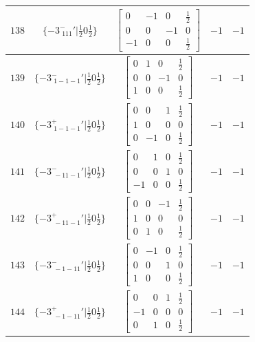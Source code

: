 \documentclass[fleqn,8pt]{jsarticle}
\begin{document}
\begin{longtable}{ccccc}
$ 138 $ & $ \{-3^{-}_{\,\,111}{}'|\frac{1}{2} 0 \frac{1}{2}\} $ & $ \begin{bmatrix} 0 & -1 & 0 & \frac{1}{2} \\ 0 & 0 & -1 & 0 \\ -1 & 0 & 0 & \frac{1}{2} \end{bmatrix} $ & $ -1 $ & $ -1 $ \\ \hline
$ 139 $ & $ \{-3^{-}_{\,\,1-1-1}{}'|\frac{1}{2} 0 \frac{1}{2}\} $ & $ \begin{bmatrix} 0 & 1 & 0 & \frac{1}{2} \\ 0 & 0 & -1 & 0 \\ 1 & 0 & 0 & \frac{1}{2} \end{bmatrix} $ & $ -1 $ & $ -1 $ \\ \hline
$ 140 $ & $ \{-3^{+}_{\,\,1-1-1}{}'|\frac{1}{2} 0 \frac{1}{2}\} $ & $ \begin{bmatrix} 0 & 0 & 1 & \frac{1}{2} \\ 1 & 0 & 0 & 0 \\ 0 & -1 & 0 & \frac{1}{2} \end{bmatrix} $ & $ -1 $ & $ -1 $ \\ \hline
$ 141 $ & $ \{-3^{-}_{\,\,-11-1}{}'|\frac{1}{2} 0 \frac{1}{2}\} $ & $ \begin{bmatrix} 0 & 1 & 0 & \frac{1}{2} \\ 0 & 0 & 1 & 0 \\ -1 & 0 & 0 & \frac{1}{2} \end{bmatrix} $ & $ -1 $ & $ -1 $ \\ \hline
$ 142 $ & $ \{-3^{+}_{\,\,-11-1}{}'|\frac{1}{2} 0 \frac{1}{2}\} $ & $ \begin{bmatrix} 0 & 0 & -1 & \frac{1}{2} \\ 1 & 0 & 0 & 0 \\ 0 & 1 & 0 & \frac{1}{2} \end{bmatrix} $ & $ -1 $ & $ -1 $ \\ \hline
$ 143 $ & $ \{-3^{-}_{\,\,-1-11}{}'|\frac{1}{2} 0 \frac{1}{2}\} $ & $ \begin{bmatrix} 0 & -1 & 0 & \frac{1}{2} \\ 0 & 0 & 1 & 0 \\ 1 & 0 & 0 & \frac{1}{2} \end{bmatrix} $ & $ -1 $ & $ -1 $ \\ \hline
$ 144 $ & $ \{-3^{+}_{\,\,-1-11}{}'|\frac{1}{2} 0 \frac{1}{2}\} $ & $ \begin{bmatrix} 0 & 0 & 1 & \frac{1}{2} \\ -1 & 0 & 0 & 0 \\ 0 & 1 & 0 & \frac{1}{2} \end{bmatrix} $ & $ -1 $ & $ -1 $ \\ \hline

\end{longtable}
\end{document}

